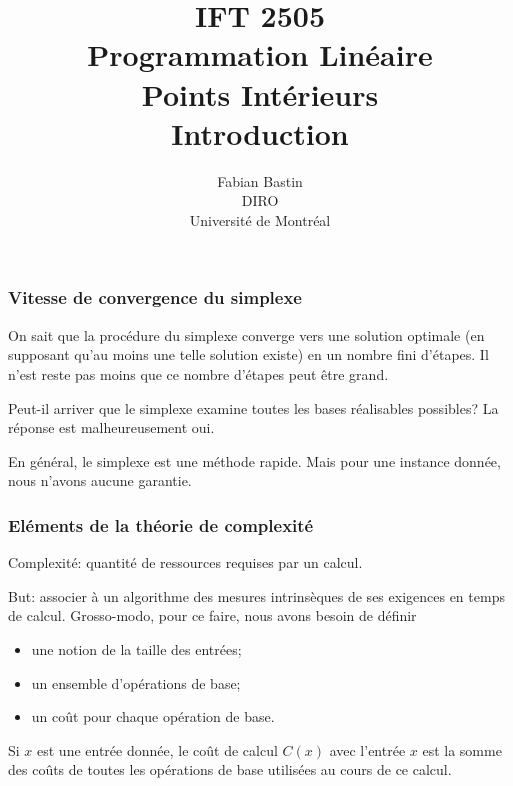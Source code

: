 \documentclass[t,usepdftitle=false]{beamer}
\title[IFT2505]{IFT 2505\\Programmation Linéaire\\Points Intérieurs\\Introduction}
\author[Fabian Bastin]{Fabian Bastin\\DIRO\\Université de Montréal}
\date{}
\begin{document}
\frame{\titlepage}


\begin{frame}
\frametitle{Vitesse de convergence du simplexe}

On sait que la procédure du simplexe converge vers une solution optimale (en supposant qu'au moins une telle solution existe) en un nombre fini d'étapes. Il n'est reste pas moins que ce nombre d'étapes peut être grand.



\mbox{}

Peut-il arriver que le simplexe examine toutes les bases réalisables possibles? La réponse est malheureusement oui.

\mbox{}

En général, le simplexe est une méthode rapide. Mais pour une instance donnée, nous n'avons aucune garantie.
\end{frame}

\begin{frame}
\frametitle{Eléments de la théorie de complexité}

Complexité: quantité de ressources requises par un calcul.

\mbox{}

But: associer à un algorithme des mesures intrinsèques de ses exigences en temps de calcul. Grosso-modo, pour ce faire, nous avons besoin de définir
\begin{itemize}
\item
une notion de la taille des entrées;
\item
un ensemble d'opérations de base;
\item
un coût pour chaque opération de base.
\end{itemize}

\mbox{}

Si $x$ est une entrée donnée, le coût de calcul $C(x)$ avec l'entrée $x$ est la somme des coûts de toutes les opérations de base utilisées au cours de ce calcul.

\end{frame}
\end{document}
